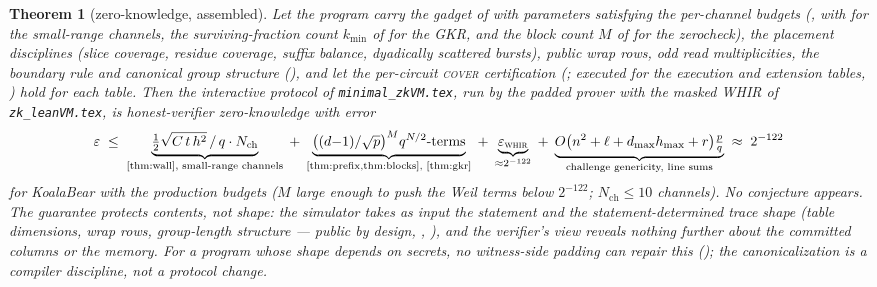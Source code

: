 \documentclass{article}
\newtheorem{theorem}{Theorem}[section]
\theoremstyle{definition}
\begin{document}
\begin{theorem}[zero-knowledge, assembled]\label{thm:zk}
Let the program carry the gadget of  with parameters satisfying the per-channel budgets (, with  for the small-range channels, the surviving-fraction count $k_{\min}$ of  for the GKR, and the block count $M$ of  for the zerocheck), the placement disciplines (slice coverage, residue coverage, suffix balance, dyadically scattered bursts), public wrap rows, odd read multiplicities, the boundary rule and canonical group structure (), and let the per-circuit \textsc{cover} certification (; executed for the execution and extension tables, ) hold for each table. Then the interactive protocol of \texttt{minimal\_zkVM.tex}, run by the padded prover with the masked WHIR of \texttt{zk\_leanVM.tex}, is honest-verifier zero-knowledge with error
\[
\varepsilon \;\leq\; \underbrace{\tfrac12\sqrt{C\,t\,h^2}\,/\,q \cdot N_{\mathrm{ch}}}_{\text{\Cref{thm:wall}, small-range channels}}
\;+\; \underbrace{\big((d{-}1)/\sqrt p\big)^{M} q^{N/2}\text{-terms}}_{\text{\Cref{thm:prefix,thm:blocks}, \Cref{thm:gkr}}}
\;+\; \underbrace{\varepsilon_{\textsc{whir}}}_{\approx 2^{-122}}
\;+\; \underbrace{O\big(n^2 + \ell + d_{\max}h_{\max} + r\big)\tfrac{p}{q}}_{\text{challenge genericity, line sums}}
\;\approx\; 2^{-122}
\]
for KoalaBear with the production budgets ($M$ large enough to push the Weil terms below $2^{-122}$; $N_{\mathrm{ch}} \leq 10$ channels). No conjecture appears. The guarantee protects \emph{contents}, not \emph{shape}: the simulator takes as input the statement and the statement-determined trace shape (table dimensions, wrap rows, group-length structure --- public by design, , ), and the verifier's view reveals nothing further about the committed columns or the memory. For a program whose shape depends on secrets, no witness-side padding can repair this (); the canonicalization is a compiler discipline, not a protocol change.
\end{theorem}
\end{document}

